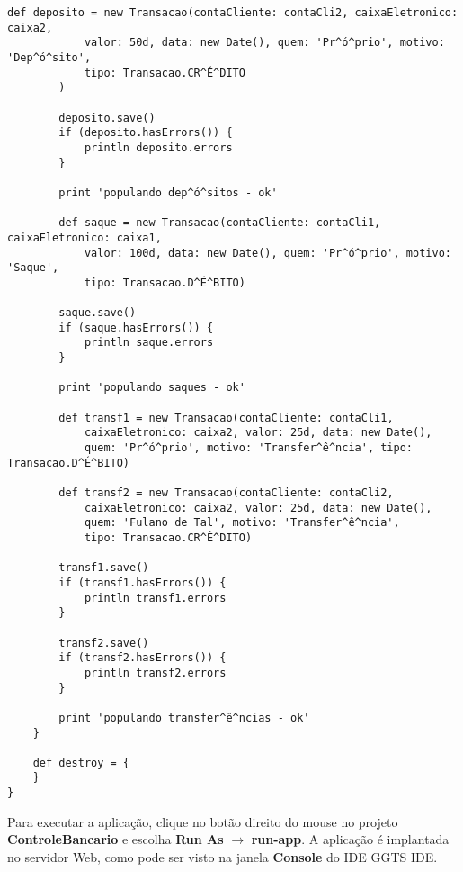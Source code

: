 \begin{lstlisting}[caption={\bf BootStrap.groovy (5)}, frame = trBL, float=htbp,
    label=codBootStrap25] 
        def deposito = new Transacao(contaCliente: contaCli2, caixaEletronico: caixa2, 
            valor: 50d, data: new Date(), quem: 'Pr^ó^prio', motivo: 'Dep^ó^sito',
            tipo: Transacao.CR^É^DITO
        )
        
        deposito.save()
        if (deposito.hasErrors()) {
            println deposito.errors
        }

        print 'populando dep^ó^sitos - ok'

        def saque = new Transacao(contaCliente: contaCli1, caixaEletronico: caixa1, 
            valor: 100d, data: new Date(), quem: 'Pr^ó^prio', motivo: 'Saque', 
            tipo: Transacao.D^É^BITO)
        
        saque.save()
        if (saque.hasErrors()) {
            println saque.errors
        }
        
        print 'populando saques - ok'
 
        def transf1 = new Transacao(contaCliente: contaCli1, 
            caixaEletronico: caixa2, valor: 25d, data: new Date(),
            quem: 'Pr^ó^prio', motivo: 'Transfer^ê^ncia', tipo: Transacao.D^É^BITO)
        
        def transf2 = new Transacao(contaCliente: contaCli2, 
            caixaEletronico: caixa2, valor: 25d, data: new Date(),
            quem: 'Fulano de Tal', motivo: 'Transfer^ê^ncia', 
            tipo: Transacao.CR^É^DITO)
        
        transf1.save()
        if (transf1.hasErrors()) {
            println transf1.errors
        }
        
        transf2.save()
        if (transf2.hasErrors()) {
            println transf2.errors
        }
        
        print 'populando transfer^ê^ncias - ok'
    }

    def destroy = {
    }
}
\end{lstlisting}

Para executar  a aplicação,  clique no  botão direito do  mouse no  projeto {\bf
  ControleBancario}  e escolha  {\bf  Run As}  $\rightarrow$  {\bf run-app}.   A
aplicação  é implantada  no servidor  Web, como  pode ser  visto na  janela {\bf
  Console} do IDE GGTS IDE. 

\vspace{0.3cm}

